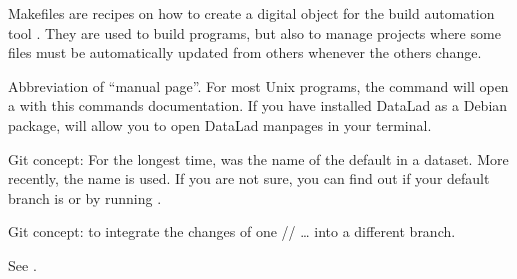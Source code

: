 \begin{description}
\sphinxAtStartPar
Makefiles are recipes on how to create a digital object for the build automation tool .
They are used to build programs, but also to manage projects where some files must be automatically updated from others whenever the others change.

\sphinxAtStartPar
Abbreviation of “manual page”. For most Unix programs, the command  will open a {\hyperref[\detokenize{glossary:term-pager}]{}} with this commands documentation. If you have installed DataLad as a Debian package,  will allow you to open DataLad manpages in your terminal.

\ignorespaces 
\sphinxAtStartPar
Git concept: For the longest time,  was the name of the default {\hyperref[\detokenize{glossary:term-branch}]{}} in a dataset. More recently, the name  is used. If you are not sure, you can find out if your default branch is  or  by running .

\ignorespaces 
\sphinxAtStartPar
Git concept: to integrate the changes of one {\hyperref[\detokenize{glossary:term-branch}]{}}/{\hyperref[\detokenize{glossary:term-sibling}]{}}/ … into
a different branch.

\ignorespaces 
\sphinxAtStartPar
See {\hyperref[\detokenize{glossary:term-pull-request}]{}}.


\end{description}
